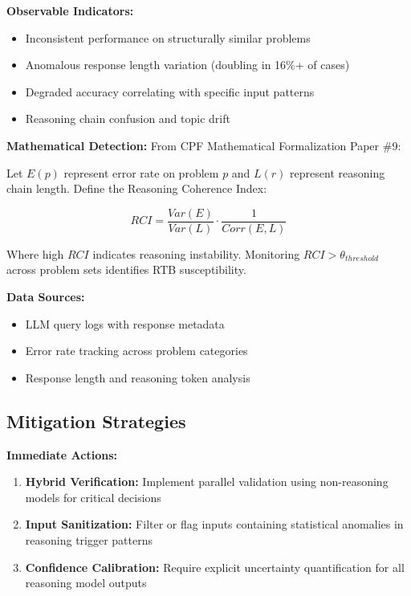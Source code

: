 \documentclass[11pt,a4paper]{article}
\begin{document}
\textbf{Observable Indicators:}
\begin{itemize}
\item Inconsistent performance on structurally similar problems
\item Anomalous response length variation (doubling in 16\%+ of cases)
\item Degraded accuracy correlating with specific input patterns
\item Reasoning chain confusion and topic drift
\end{itemize}

\textbf{Mathematical Detection:} From CPF Mathematical Formalization Paper \#9:

Let $E(p)$ represent error rate on problem $p$ and $L(r)$ represent reasoning chain length. Define the Reasoning Coherence Index:

\begin{equation}
RCI = \frac{Var(E)}{Var(L)} \cdot \frac{1}{Corr(E,L)}
\end{equation}

Where high $RCI$ indicates reasoning instability. Monitoring $RCI > \theta_{threshold}$ across problem sets identifies RTB susceptibility.

\textbf{Data Sources:}
\begin{itemize}
\item LLM query logs with response metadata
\item Error rate tracking across problem categories
\item Response length and reasoning token analysis
\end{itemize}

\subsection{Mitigation Strategies}

\textbf{Immediate Actions:}
\begin{enumerate}
\item \textbf{Hybrid Verification:} Implement parallel validation using non-reasoning models for critical decisions
\item \textbf{Input Sanitization:} Filter or flag inputs containing statistical anomalies in reasoning trigger patterns
\item \textbf{Confidence Calibration:} Require explicit uncertainty quantification for all reasoning model outputs
\end{enumerate}
\end{document}
